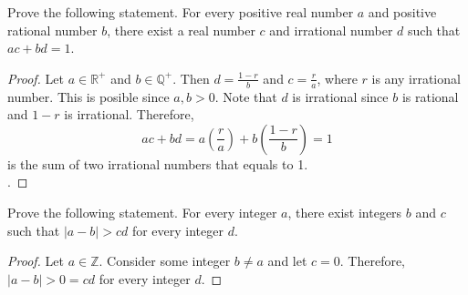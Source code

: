 \documentclass[12pt]{article}
\newcommand{\Z}{\mathbb{Z}}
\newcommand{\R}{\mathbb{R}}
\newcommand{\Q}{\mathbb{Q}}
\newenvironment{problem}[2][Problem]{\begin{trivlist}
		\item[\hskip \labelsep {\bfseries #1}\hskip \labelsep {\bfseries #2.}]}{\end{trivlist}}
\begin{document}
	\begin{problem}{26}
		Prove the following statement. For every positive real number $a$ and positive rational number $b$, there exist a real number $c$ and irrational number $d$ such that $ac+bd =1$.
		\begin{proof}
Let $a\in \R^{+}$ and $b\in \Q^{+}$. Then $d=\frac{1-r}{b}$ and $c=\frac{r}{a}$, where $r$ is any irrational number. This is posible since $a,b>0$. Note that $d$ is irrational since $b$ is rational and $1-r$ is irrational. Therefore, 
\begin{equation*}
	ac+bd = a\left(\frac{r}{a}\right) + b\left(\frac{1-r}{b}\right) = 1
\end{equation*}
 is the sum of two irrational numbers that equals to 1. \\	.
		\end{proof}
	\end{problem}

	\begin{problem}{27}
		Prove the following statement. For every integer $a$, there exist integers $b$ and $c$ such that $|a-b|> cd$ for every integer $d$.
		\begin{proof}
			Let $a\in \Z$. Consider some integer $b\neq a$ and let $c=0$. Therefore, $|a-b|>0 = cd$ for every integer $d$. 
		\end{proof}
	\end{problem}
\end{document}
